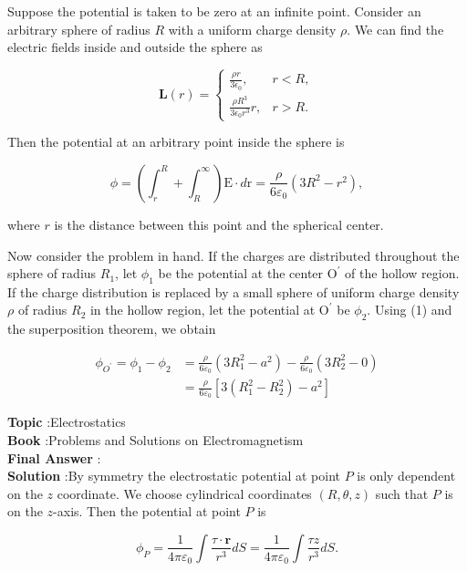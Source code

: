 \documentclass[10pt]{article}
\begin{document}
 Suppose the potential is taken to be zero at an infinite point. Consider an arbitrary sphere of radius $R$ with a uniform charge density $\rho$. We can find the electric fields inside and outside the sphere as

$$
\boldsymbol{L}(r)= \begin{cases}\frac{\rho r}{3 \epsilon_{0}}, & r<R, \\ \frac{\rho R^{3}}{3 \epsilon_{0} r^{3}} r, & r>R .\end{cases}
$$

Then the potential at an arbitrary point inside the sphere is

$$
\phi=\left(\int_{r}^{R}+\int_{R}^{\infty}\right) \mathrm{E} \cdot d \mathrm{r}=\frac{\rho}{6 \varepsilon_{0}}\left(3 R^{2}-r^{2}\right),
$$

where $r$ is the distance between this point and the spherical center.

Now consider the problem in hand. If the charges are distributed throughout the sphere of radius $R_{1}$, let $\phi_{1}$ be the potential at the center $\mathrm{O}^{\prime}$ of the hollow region. If the charge distribution is replaced by a small sphere of uniform charge density $\rho$ of radius $R_{2}$ in the hollow region, let the potential at $\mathrm{O}^{\prime}$ be $\phi_{2}$. Using (1) and the superposition theorem, we obtain

$$
\begin{aligned}
\phi_{O^{\prime}}=\phi_{1}-\phi_{2} &=\frac{\rho}{6 \varepsilon_{0}}\left(3 R_{1}^{2}-a^{2}\right)-\frac{\rho}{6 \varepsilon_{0}}\left(3 R_{2}^{2}-0\right) \\
&=\frac{\rho}{6 \varepsilon_{0}}\left[3\left(R_{1}^{2}-R_{2}^{2}\right)-a^{2}\right]
\end{aligned}
$$

\textbf{Topic} :Electrostatics\\
\textbf{Book} :Problems and Solutions on Electromagnetism\\
\textbf{Final Answer} :\\


\textbf{Solution} :By symmetry the electrostatic potential at point $P$ is only dependent on the $z$ coordinate. We choose cylindrical coordinates $(R, \theta, z)$ such that $P$ is on the $z$-axis. Then the potential at point $P$ is

$$
\phi_{P}=\frac{1}{4 \pi \varepsilon_{0}} \int \frac{\tau \cdot \mathbf{r}}{r^{3}} d S=\frac{1}{4 \pi \varepsilon_{0}} \int \frac{\tau z}{r^{3}} d S .
$$
\end{document}
